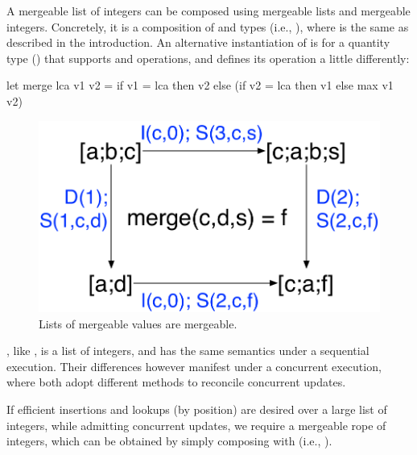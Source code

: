 A mergeable list of integers can be composed using mergeable lists and
mergeable integers.  Concretely, it is a composition of  and 
types (i.e., ), where  is the same as
 described in the introduction.  An alternative instantiation
of  is for a quantity type () that supports  and
 operations, and defines its  operation a little
differently:
\begin{ocaml}
let merge lca v1 v2 = if v1 = lca then v2
    else (if v2 = lca then v1 else max v1 v2)
\end{ocaml}
\begin{figure}
  \centering
  \includegraphics[scale=0.4]{Figures/list-eg}
  \caption{Lists of mergeable values are mergeable. }
  \label{fig:list-eg}
  \vspace*{-.45in}
\end{figure}
, like , is a list of integers, and has the same
semantics under a sequential execution. Their differences however manifest
under a concurrent execution, where both adopt different methods to reconcile
concurrent updates.

If efficient insertions and lookups (by position) are desired over a
large list of integers, while admitting concurrent updates, we require
a mergeable rope of integers, which can be obtained by simply
composing  with  (i.e., ).


